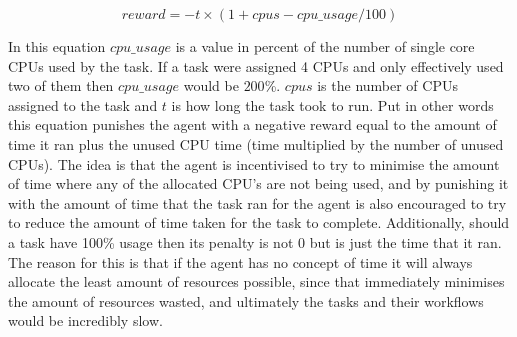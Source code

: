 \begin{equation}\label{bandit1_reward}
reward = -t\times(1+cpus - cpu\_usage/100)
\end{equation}


In this equation $cpu\_usage$ is a value in percent of the number of single core CPUs used by the task. If a task were assigned 4 CPUs and only effectively used two of them then $cpu\_usage$ would be $200$\%. $cpus$ is the number of CPUs assigned to the task and $t$ is how long the task took to run. Put in other words this equation punishes the agent with a negative reward equal to the amount of time it ran plus the unused CPU time (time multiplied by the number of unused CPUs). The idea is that the agent is incentivised to try to minimise the amount of time where any of the allocated CPU’s are not being used, and by punishing it with the amount of time that the task ran for the agent is also encouraged to try to reduce the amount of time taken for the task to complete. Additionally, should a task have 100\% usage then its penalty is not 0 but is just the time that it ran. The reason for this is that if the agent has no concept of time it will always allocate the least amount of resources possible, since that immediately minimises the amount of resources wasted, and ultimately the tasks and their workflows would be incredibly slow. 

